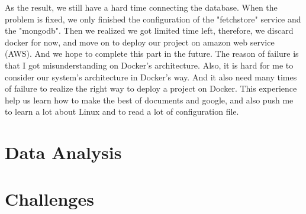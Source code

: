 \documentclass{article}
\begin{document}
As the result, we still have a hard time connecting the database. When the problem is fixed, we only finished the configuration of the "fetchstore" service and the "mongodb". Then we realized we got limited time left, therefore, we discard docker for now, and move on to deploy our project on amazon web service (AWS). And we hope to complete this part in the future.
The reason of failure is that I got misunderstanding on Docker's architecture. Also, it is hard for me to consider our system's architecture in Docker's way. And it also need many times of failure to realize the right way to deploy a project on Docker. This experience help us learn how to make the best of documents and google, and also push me to learn a lot about Linux and to read a lot of configuration file.
\section{Data Analysis}
\section{Challenges}
\printglossary
\end{document}
